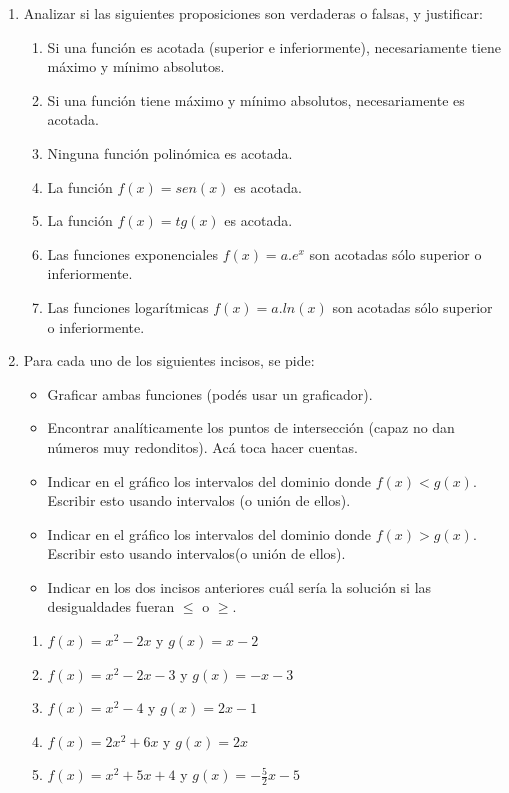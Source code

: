 \documentclass[12pt]{article}
\theoremstyle{definition}
\newtheorem*{mydef}{Definición}
\begin{document}
\begin{enumerate}
{{\begin{mydef}
\begin{itemize}
El número real  $m$  es el mínimo del conjunto de las imágenes.
\end{itemize}
\end{mydef}
}}  %


\item Analizar si las siguientes proposiciones son verdaderas o falsas, y justificar:
 \begin{enumerate}
\setlength\itemsep{0em}
\item Si una función es acotada (superior e inferiormente), necesariamente tiene máximo y mínimo absolutos.
\item Si una función tiene máximo y mínimo absolutos, necesariamente es acotada.
\item Ninguna función polinómica es acotada. 
\item La función $f(x) = sen(x)$ es acotada.
\item La función $f(x) = tg(x)$ es acotada.
\item Las funciones exponenciales $f(x) = a.e^x$ son acotadas sólo superior o inferiormente.
\item Las funciones logarítmicas $f(x) = a. ln(x)$ son acotadas sólo superior o inferiormente.
\end{enumerate}
\item  Para cada uno de los siguientes incisos, se pide:
\begin{itemize}
\item Graficar ambas funciones (podés usar un graficador).
\item Encontrar analíticamente los puntos de intersección (capaz no dan números muy redonditos). Acá toca hacer cuentas.
\item  Indicar en el gráfico los intervalos del dominio donde $f(x) < g(x)$. Escribir esto usando intervalos (o unión de ellos).
\item  Indicar en el gráfico los intervalos del dominio donde $f(x) > g(x)$. Escribir esto usando intervalos(o unión de ellos).
\item  Indicar en los dos incisos anteriores cuál sería la solución si las desigualdades fueran $\leq$ o $\geq$.
\end{itemize}
\begin{enumerate}
\item $f(x) = x^2 - 2x$ y $g(x) = x - 2$
\item $f(x) = x^2 - 2x - 3$ y $g(x) = -x - 3$
\item $f(x) = x^2 - 4$ y $g(x) = 2x - 1$
\item $f(x) = 2x^2 + 6x$ y $g(x) = 2x$
\item $f(x) = x^2 + 5x + 4$ y $g(x) = -\frac{5}{2}x - 5$
\end{enumerate}


\end{enumerate}
\end{document}
